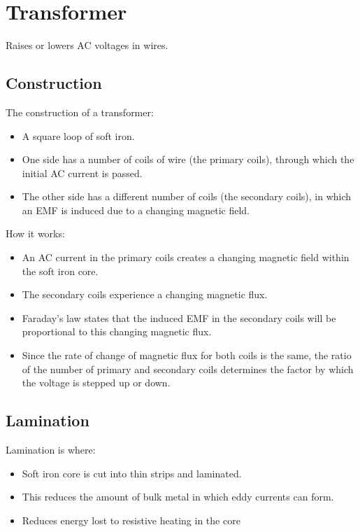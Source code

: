 \documentclass[a4paper,11pt]{article}
\begin{document}
\section{Transformer}

Raises or lowers AC voltages in wires.


\subsection{Construction}

The construction of a transformer:

\begin{itemize}
\item A square loop of soft iron.
\item One side has a number of coils of wire (the primary coils), through which
	the initial AC current is passed.
\item The other side has a different number of coils (the secondary coils),
	in which an EMF is induced due to a changing magnetic field.
\end{itemize}

How it works:

\begin{itemize}
\item An AC current in the primary coils creates a changing magnetic field
	within the soft iron core.
\item The secondary coils experience a changing magnetic flux.
\item Faraday's law states that the induced EMF in the secondary coils will be
	proportional to this changing magnetic flux.
\item Since the rate of change of magnetic flux for both coils is the same,
	the ratio of the number of primary and secondary coils determines the
	factor by which the voltage is stepped up or down.
\end{itemize}


\subsection{Lamination}

Lamination is where:

\begin{itemize}
\item Soft iron core is cut into thin strips and laminated.
\item This reduces the amount of bulk metal in which eddy currents can form.
\item Reduces energy lost to resistive heating in the core
\end{itemize}
\end{document}

